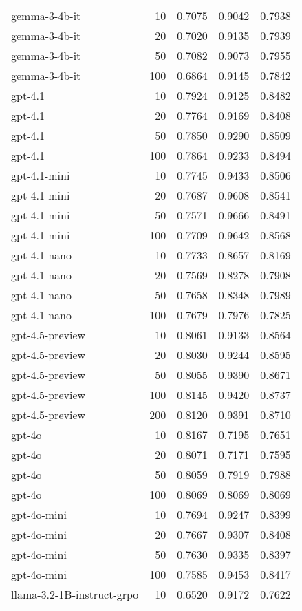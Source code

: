 \begin{tabular}{lrrrr}
gemma-3-4b-it & 10 & 0.7075 & 0.9042 & 0.7938 \\
gemma-3-4b-it & 20 & 0.7020 & 0.9135 & 0.7939 \\
gemma-3-4b-it & 50 & 0.7082 & 0.9073 & 0.7955 \\
gemma-3-4b-it & 100 & 0.6864 & 0.9145 & 0.7842 \\
gpt-4.1 & 10 & 0.7924 & 0.9125 & 0.8482 \\
gpt-4.1 & 20 & 0.7764 & 0.9169 & 0.8408 \\
gpt-4.1 & 50 & 0.7850 & 0.9290 & 0.8509 \\
gpt-4.1 & 100 & 0.7864 & 0.9233 & 0.8494 \\
gpt-4.1-mini & 10 & 0.7745 & 0.9433 & 0.8506 \\
gpt-4.1-mini & 20 & 0.7687 & 0.9608 & 0.8541 \\
gpt-4.1-mini & 50 & 0.7571 & 0.9666 & 0.8491 \\
gpt-4.1-mini & 100 & 0.7709 & 0.9642 & 0.8568 \\
gpt-4.1-nano & 10 & 0.7733 & 0.8657 & 0.8169 \\
gpt-4.1-nano & 20 & 0.7569 & 0.8278 & 0.7908 \\
gpt-4.1-nano & 50 & 0.7658 & 0.8348 & 0.7989 \\
gpt-4.1-nano & 100 & 0.7679 & 0.7976 & 0.7825 \\
gpt-4.5-preview & 10 & 0.8061 & 0.9133 & 0.8564 \\
gpt-4.5-preview & 20 & 0.8030 & 0.9244 & 0.8595 \\
gpt-4.5-preview & 50 & 0.8055 & 0.9390 & 0.8671 \\
gpt-4.5-preview & 100 & 0.8145 & 0.9420 & 0.8737 \\
gpt-4.5-preview & 200 & 0.8120 & 0.9391 & 0.8710 \\
gpt-4o & 10 & 0.8167 & 0.7195 & 0.7651 \\
gpt-4o & 20 & 0.8071 & 0.7171 & 0.7595 \\
gpt-4o & 50 & 0.8059 & 0.7919 & 0.7988 \\
gpt-4o & 100 & 0.8069 & 0.8069 & 0.8069 \\
gpt-4o-mini & 10 & 0.7694 & 0.9247 & 0.8399 \\
gpt-4o-mini & 20 & 0.7667 & 0.9307 & 0.8408 \\
gpt-4o-mini & 50 & 0.7630 & 0.9335 & 0.8397 \\
gpt-4o-mini & 100 & 0.7585 & 0.9453 & 0.8417 \\
llama-3.2-1B-instruct-grpo & 10 & 0.6520 & 0.9172 & 0.7622 \\

\end{tabular}
